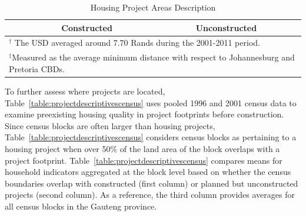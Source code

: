 \documentclass[12pt]{article}
\begin{document}
\vspace{0mm}
\begin{table}[h!]
\centering
\caption{Housing Project Areas Description}\label{table:projectdescriptives}
\vspace{0mm}
\begin{tabular}{l*{1}{cc}}
\toprule
  &Constructed & Unconstructed \\
\midrule

\bottomrule
\multicolumn{3}{l}{\scriptsize $^\dagger$ The USD averaged around 7.70 Rands during the 2001-2011 period.}\\[-.5em]
\multicolumn{3}{l}{\scriptsize $^\ddagger$Measured as the average minimum distance with respect to Johannesburg and Pretoria CBDs. } \\[-.5em]
\end{tabular}
\end{table} 


To further assess where projects are located, Table~\ref{table:projectdescriptivescensus} uses pooled 1996 and 2001 census data to examine preexisting housing quality in project footprints before construction.  Since census blocks are often larger than housing projects, Table~\ref{table:projectdescriptivescensus} considers census blocks as pertaining to a housing project when over 50\% of the land area of the block overlaps with a project footprint.  Table~\ref{table:projectdescriptivescensus} compares means for household indicators aggregated at the block level based on whether the census boundaries overlap with constructed (first column) or planned but unconstructed projects (second column).  As a reference, the third column provides averages for all census blocks in the Gauteng province.
\end{document}
